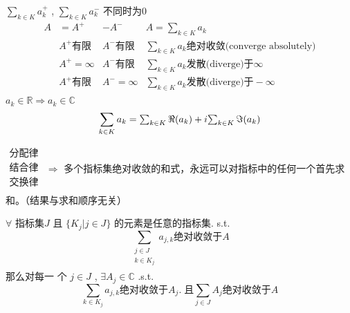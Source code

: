 \documentclass[mode=geye]{elegantnote}
\newcommand\tikznode[3][]%
{\tikz[remember picture,baseline=(#2.base)]
	\node[minimum size=0pt,inner sep=0pt,#1](#2){#3};%
}
\begin{document}
$ \sum_{k\in K} a_k^+ $ ,
$ \sum_{k\in K} a_k^- $ 不同时为0
\begin{equation*}
    \begin{array}{llll}
        A &= A^+ &- A^- & A =  \sum_{k\in K} a_k \\ 
          &A^+\text{有限} & A^-\text{有限}& \sum_{k\in K} a_k \text{绝对收敛(converge absolutely)} \\
          &A^+=\infty & A^-\text{有限}& \sum_{k\in K} a_k \text{发散(diverge)于}\infty \\
          &A^+\text{有限} & A^-=\infty& \sum_{k\in K} a_k \text{发散(diverge)于}-\infty \\
    \end{array}
\end{equation*}
$ a_k\in\mathbb{R} \Rightarrow a_k\in\mathbb{C} $ 
\begin{equation*}
    \sum_{k\in K} a_k =
    \tikznode{akRe}{$ \sum_{k\in K} \Re{(a_k)} $ } +
    i\tikznode{akIm}{$ \sum_{k\in K} \Im{(a_k)} $ }    
\end{equation*}


$\begin{array}{l}
    \text{分配律}\\
    \text{结合律}\\
    \text{交换律}\\
\end{array}$
$ \Rightarrow $ 多个指标集绝对收敛的和式，永远可以对指标中的任何一个首先求和。（结果与求和顺序无关）

$ \forall $ 指标集$  J $  且 $ \{K_j|j\in J\} $  的元素是任意的指标集. s.t.
\begin{equation*}
    \sum_{
        \begin{array}{l}
            j\in J \\
            k\in K_j\\
        \end{array}}a_{j,k}
    \text{绝对收敛于}A
\end{equation*} 
那么对每一
个 $ j\in J $ , $ \exists A_j \in \mathbb{C} $ .s.t.
\begin{equation*}
    \sum_{k\in K_j}a_{j,k}
    \text{绝对收敛于}A_j. \;
    \text{且}\sum_{j\in J}A_j
    \text{绝对收敛于}A
\end{equation*}
\end{document}
